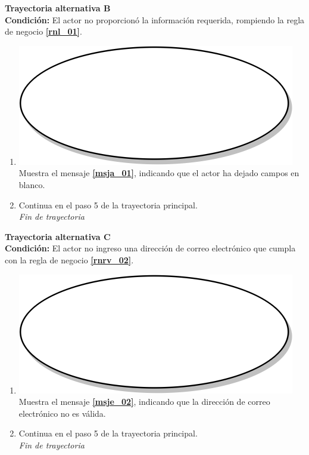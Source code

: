 \textbf{Trayectoria alternativa B} \label{cu2_ta_b} \\
\textbf{Condición:} El actor no proporcionó la información requerida, rompiendo la regla de negocio \textbf{\ref{rnl_01}}.\\
 \begin{enumerate}[label=B\arabic*]
    \item {\includegraphics[scale=.05]{Capitulo3/img/proceso.png} Muestra el mensaje \textbf{\ref{msja_01}}, indicando que el actor ha dejado campos en blanco.}
    \item {Continua en el paso 5  de la trayectoria principal.} \\
    \textit{Fin de trayectoria} \\
\end{enumerate}

\textbf{Trayectoria alternativa C} \label{cu2_ta_c}\\
\textbf{Condición:} El actor no ingreso una dirección de correo electrónico que cumpla con la regla de negocio \textbf{\ref{rnrv_02}}.\\
 \begin{enumerate}[label=C\arabic*]
    \item {\includegraphics[scale=.05]{Capitulo3/img/proceso.png} Muestra el mensaje \textbf{\ref{msje_02}}, indicando que la dirección de correo electrónico no es válida.}
    \item {Continua en el paso 5 de la trayectoria principal.} \\
    \textit{Fin de trayectoria} \\
\end{enumerate}

